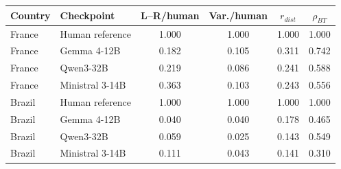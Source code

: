 \begin{tabular}{llcccc}
\toprule
Country & Checkpoint & L--R/human & Var./human & $r_{dist}$ & $\rho_{BT}$ \\
\midrule
France & Human reference & 1.000 & 1.000 & 1.000 & 1.000 \\
France & Gemma 4-12B & 0.182 & 0.105 & 0.311 & 0.742 \\
France & Qwen3-32B & 0.219 & 0.086 & 0.241 & 0.588 \\
France & Ministral 3-14B & 0.363 & 0.103 & 0.243 & 0.556 \\
Brazil & Human reference & 1.000 & 1.000 & 1.000 & 1.000 \\
Brazil & Gemma 4-12B & 0.040 & 0.040 & 0.178 & 0.465 \\
Brazil & Qwen3-32B & 0.059 & 0.025 & 0.143 & 0.549 \\
Brazil & Ministral 3-14B & 0.111 & 0.043 & 0.141 & 0.310 \\
\bottomrule
\end{tabular}
